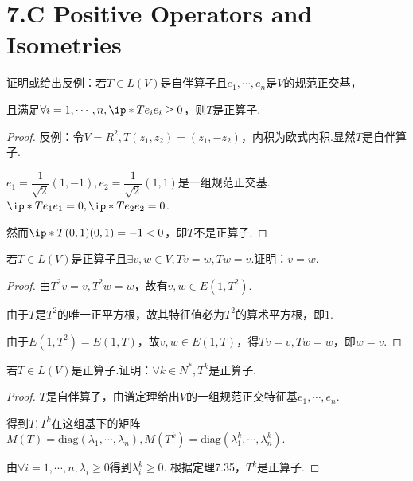 \section{7.C Positive Operators and Isometries}

\begin{problem}[1]\label{7.C.1}
    证明或给出反例：若\(T \in L(V)\)是自伴算子且\(e_1,\cdots,e_n\)是\(V\)的规范正交基，

    且满足\(\forall i=1,\cdots,n,\ip*{Te_i}{e_i} \geq 0\)，则\(T\)是正算子.
\end{problem}

\begin{proof}
    反例：令\(V=R^2,T(z_1,z_2)=(z_1,-z_2)\)，内积为欧式内积.显然\(T\)是自伴算子.

    \(e_1=\dfrac{1}{\sqrt{2}}(1,-1),e_2=\dfrac{1}{\sqrt{2}}(1,1)\)是一组规范正交基.
    \(\ip*{Te_1}{e_1}=0,\ip*{Te_2}{e_2}=0\).
    
    然而\(\ip*{T(0,1)}{(0,1)}=-1<0\)，即\(T\)不是正算子.
\end{proof}

\begin{problem}[2]\label{7.C.2}
    若\(T \in L(V)\)是正算子且\(\exists v,w \in V,Tv=w,Tw=v\).证明：\(v=w\).
\end{problem}

\begin{proof}
    由\(T^2v=v,T^2w=w\)，故有\(v,w \in E(1,T^2)\).

    由于\(T\)是\(T^2\)的唯一正平方根，故其特征值必为\(T^2\)的算术平方根，即\(1\).
    
    由于\(E(1,T^2)=E(1,T)\)，故\(v,w \in E(1,T)\)，得\(Tv=v,Tw=w\)，即\(w=v\).
\end{proof}

\begin{problem}[6]\label{7.C.6}
    若\(T \in L(V)\)是正算子.证明：\(\forall k \in N^*,T^k\)是正算子.
\end{problem}

\begin{proof}
    \(T\)是自伴算子，由谱定理给出\(V\)的一组规范正交特征基\(e_1,\cdots,e_n\).

    得到\(T,T^k\)在这组基下的矩阵\(M(T)=\mathrm{diag}(\lambda_1,\cdots,\lambda_n),M(T^k)=\mathrm{diag}(\lambda_1^k,\cdots,\lambda_n^k)\).

    由\(\forall i=1,\cdots,n,\lambda_i \geq 0\)得到\(\lambda_i^k \geq 0\).
    根据定理7.35，\(T^k\)是正算子.
\end{proof}

